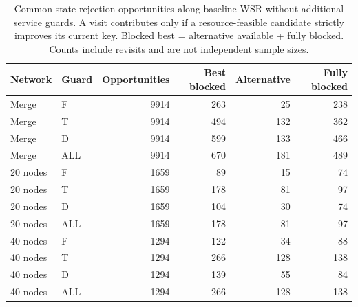 \begin{table}[!htbp]
\caption{Common-state rejection opportunities along baseline WSR without additional service guards. A visit contributes only if a resource-feasible candidate strictly improves its current key. Blocked best = alternative available + fully blocked. Counts include revisits and are not independent sample sizes.}\label{tab:service-split-rejections}
\centering\small
\begin{tabularx}{\textwidth}{l l r r r r}
\toprule Network & Guard & Opportunities & Best blocked & Alternative & Fully blocked\\\midrule
Merge & F & 9914 & 263 & 25 & 238\\
Merge & T & 9914 & 494 & 132 & 362\\
Merge & D & 9914 & 599 & 133 & 466\\
Merge & ALL & 9914 & 670 & 181 & 489\\
20 nodes & F & 1659 & 89 & 15 & 74\\
20 nodes & T & 1659 & 178 & 81 & 97\\
20 nodes & D & 1659 & 104 & 30 & 74\\
20 nodes & ALL & 1659 & 178 & 81 & 97\\
40 nodes & F & 1294 & 122 & 34 & 88\\
40 nodes & T & 1294 & 266 & 128 & 138\\
40 nodes & D & 1294 & 139 & 55 & 84\\
40 nodes & ALL & 1294 & 266 & 128 & 138\\
\bottomrule
\end{tabularx}
\end{table}

